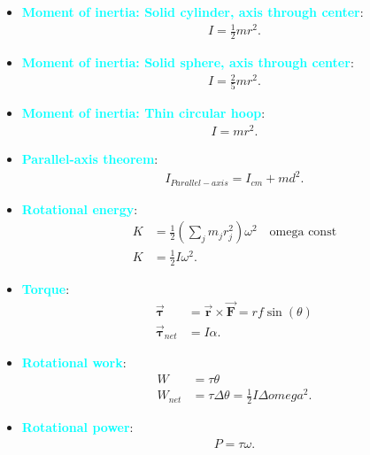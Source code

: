 \documentclass{report}
\begin{document}
\begin{itemize}
        \item \textbf{\textcolor{cyan}{Moment of inertia: Solid cylinder, axis through center}}:
            \begin{align*}
                I = \frac{1}{2}mr^{2}
            .\end{align*}
        \item \textbf{\textcolor{cyan}{Moment of inertia: Solid sphere, axis through center}}:
            \begin{align*}
                I = \frac{2}{5}mr^{2}
            .\end{align*}
        \item \textbf{\textcolor{cyan}{Moment of inertia: Thin circular hoop}}:
            \begin{align*}
                I = mr^{2}
            .\end{align*}
        \item \textbf{\textcolor{cyan}{Parallel-axis theorem}}:
            \begin{align*}
                I_{Parallel-axis} = I_{cm} + md^{2}
            .\end{align*}
        \item \textbf{\textcolor{cyan}{Rotational energy}}:
            \begin{align*}
                K &= \frac{1}{2}\left(\sum_{j}m_{j}r_{j}^{2}\right)\omega^{2} \quad \text{omega const} \\
                K &= \frac{1}{2}I\omega^{2}
            .\end{align*}
        \item \textbf{\textcolor{cyan}{Torque}}:
            \begin{align*}
                \vec{\mathbf{\tau}} &= \vec{\mathbf{r}} \times \vec{\mathbf{F}} = rf\sin{\left(\theta \right)} \\
                \vec{\mathbf{\tau}}_{net} &= I\alpha
            .\end{align*}
        \item \textbf{\textcolor{cyan}{Rotational work}}:
            \begin{align*}
                W &= \tau \theta  \\
                W_{net} &= \tau\Delta \theta = \frac{1}{2}I\Delta omega^{2}
            .\end{align*}
        \item \textbf{\textcolor{cyan}{Rotational power}}:
            \begin{align*}
                P = \tau \omega
            .\end{align*}





\end{itemize}
\end{document}
